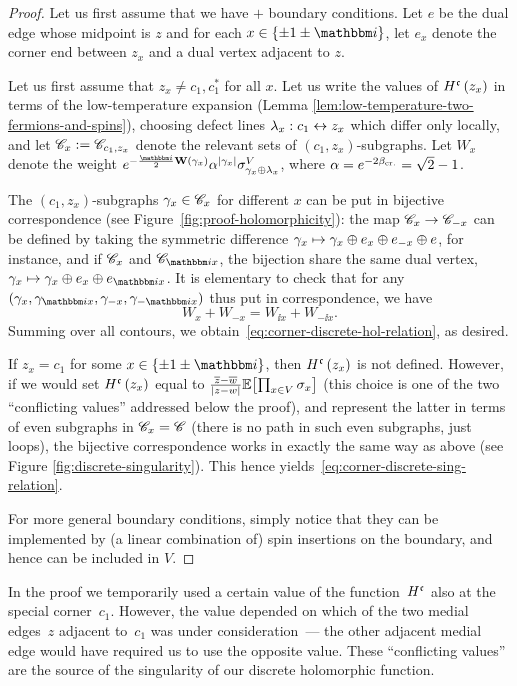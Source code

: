 \documentclass[12pt,oneside,english]{amsart}
\numberwithin{equation}{section}
\numberwithin{figure}{section}
\theoremstyle{plain}
\theoremstyle{plain}
\theoremstyle{plain}
\theoremstyle{plain}
\theoremstyle{remark}
\theoremstyle{definition}
\theoremstyle{plain}
\theoremstyle{plain}
\numberwithin{thm}{section}
\begin{document}
\begin{proof}
Let us first assume that we have $+$ boundary conditions. Let $e$
be the dual edge whose midpoint is $z$ and for each 
$x\in\set{ \pm 1 \pm \ii } $,
let $e_{x}$ denote
the corner end between $z_x$ and a dual vertex adjacent to $z$.

Let us first assume that $z_{x} \neq c_{1}, c_{1}^*$
for all $x$.
Let us write
the values of $H^{\mathfrak{c}} \left(z_{x}\right)$ in terms of the low-temperature
expansion (Lemma \ref{lem:low-temperature-two-fermions-and-spins}),
choosing %
defect lines ${\lambda}_{x}:c_{1}\leftrightarrow z_{x}$
which differ only locally,
and let ${\mathscr{C}}_{x} := {\mathscr{C}}_{c_{1},z_{x}}$ denote the relevant
sets of $(c_1 , z_x)$-subgraphs. Let $W_{x}$ denote the weight 
$e^{-\frac{\ii}{2}\mathbf{W}\left(\LTEishelem_{x}\right)}
  \alpha^{ \left| \LTEishelem_{x} \right| }
  \spin_{\LTEishelem_{x}\oplus\cordefline_{x}}^{V}$,
where $\alpha = e^{-2{{\beta}}_{\mathrm{cr.}} }=\sqrt{2}-1$.

The $(c_1 , z_x)$-subgraphs ${\gamma}_{x}\in{\mathscr{C}}_{x}$
for different $x$ can be put in
bijective correspondence (see Figure~\ref{fig:proof-holomorphicity}):
the map ${\mathscr{C}}_{x} \to {\mathscr{C}}_{-x}$ can be defined by taking
the symmetric difference ${\gamma}_{x}\mapsto{\gamma}_{x}\oplus 
e_{x}\oplus 
e_{-x}\oplus e$,
for instance, and if ${\mathscr{C}}_{x}$ and $\LTEset_{\ii x}$, the
bijection share the same dual vertex, 
$\LTEishelem_{x}\mapsto\LTEishelem_{x}\oplus 
e_{x}\oplus e_{\ii x}$.
It is elementary to check that for any %
$\left(\LTEishelem_{x},\LTEishelem_{\ii 
x},\LTEishelem_{-x},\LTEishelem_{-\ii x}\right)$
thus put in correspondence, we have 
\[
W_{x}+W_{-x}=W_{\ii x}+W_{-\ii x}.
\]
Summing over all contours, we obtain~\eqref{eq:corner-discrete-hol-relation},
as desired.

If $z_{x}=c_{1}$ for some $x \in\set{ \pm1 \pm \ii } $,
then $H^{\mathfrak{c}} \left(z_{x}\right)$ is not defined. However, if we would set
$H^{\mathfrak{c}} \left(z_{x}\right)$ equal to
$\frac{\overline{z}-\overline{w}}{|z-w|} \mathbb{E} \! \left[ { \prod_{x\in V} {\sigma}_{x} } \right]$
(this choice is one of the two ``conflicting values'' addressed below the 
proof),
and represent the latter in terms of even subgraphs in 
${\mathscr{C}}_{x} = {\mathscr{C}}$
(there is no path in such even subgraphs, just loops), the bijective 
correspondence works in exactly the same way as above (see Figure 
\ref{fig:discrete-singularity}).
This hence yields~\eqref{eq:corner-discrete-sing-relation}.

For more general boundary conditions, simply notice that they can
be implemented by (a linear combination of) spin insertions on the
boundary, and hence can be included in $V$. 
\end{proof}
In the proof we temporarily used a certain value of the function~$H^{\mathfrak{c}}$ 
also at the special corner~$c_1$. However, the value depended on which of the 
two medial edges~$z$ adjacent to~$c_1$ was under consideration~--- the other 
adjacent medial edge would have required us to use the opposite value. These 
``conflicting values'' are the source of the singularity of our discrete 
holomorphic function.
\end{document}
